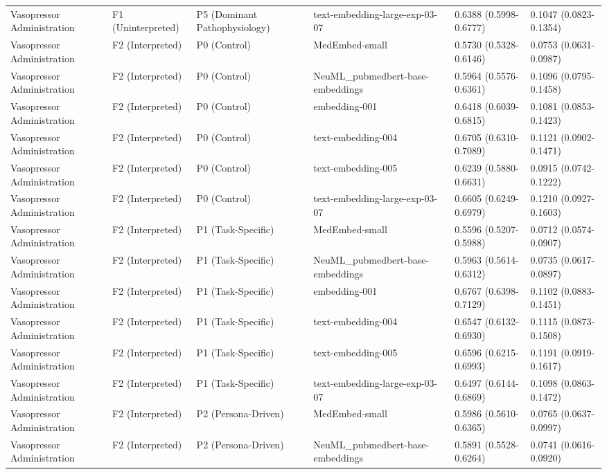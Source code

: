 \documentclass[border=0pt]{standalone}
\begin{document}
\begin{adjustbox}{width=\textwidth}
\begin{tabular}{llllll}
Vasopressor Administration & F1 (Uninterpreted) & P5 (Dominant Pathophysiology) & text-embedding-large-exp-03-07 & 0.6388 (0.5998-0.6777) & 0.1047 (0.0823-0.1354) \\
Vasopressor Administration & F2 (Interpreted) & P0 (Control) & MedEmbed-small & 0.5730 (0.5328-0.6146) & 0.0753 (0.0631-0.0987) \\
Vasopressor Administration & F2 (Interpreted) & P0 (Control) & NeuML\_pubmedbert-base-embeddings & 0.5964 (0.5576-0.6361) & 0.1096 (0.0795-0.1458) \\
Vasopressor Administration & F2 (Interpreted) & P0 (Control) & embedding-001 & 0.6418 (0.6039-0.6815) & 0.1081 (0.0853-0.1423) \\
Vasopressor Administration & F2 (Interpreted) & P0 (Control) & text-embedding-004 & 0.6705 (0.6310-0.7089) & 0.1121 (0.0902-0.1471) \\
Vasopressor Administration & F2 (Interpreted) & P0 (Control) & text-embedding-005 & 0.6239 (0.5880-0.6631) & 0.0915 (0.0742-0.1222) \\
Vasopressor Administration & F2 (Interpreted) & P0 (Control) & text-embedding-large-exp-03-07 & 0.6605 (0.6249-0.6979) & 0.1210 (0.0927-0.1603) \\
Vasopressor Administration & F2 (Interpreted) & P1 (Task-Specific) & MedEmbed-small & 0.5596 (0.5207-0.5988) & 0.0712 (0.0574-0.0907) \\
Vasopressor Administration & F2 (Interpreted) & P1 (Task-Specific) & NeuML\_pubmedbert-base-embeddings & 0.5963 (0.5614-0.6312) & 0.0735 (0.0617-0.0897) \\
Vasopressor Administration & F2 (Interpreted) & P1 (Task-Specific) & embedding-001 & 0.6767 (0.6398-0.7129) & 0.1102 (0.0883-0.1451) \\
Vasopressor Administration & F2 (Interpreted) & P1 (Task-Specific) & text-embedding-004 & 0.6547 (0.6132-0.6930) & 0.1115 (0.0873-0.1508) \\
Vasopressor Administration & F2 (Interpreted) & P1 (Task-Specific) & text-embedding-005 & 0.6596 (0.6215-0.6993) & 0.1191 (0.0919-0.1617) \\
Vasopressor Administration & F2 (Interpreted) & P1 (Task-Specific) & text-embedding-large-exp-03-07 & 0.6497 (0.6144-0.6869) & 0.1098 (0.0863-0.1472) \\
Vasopressor Administration & F2 (Interpreted) & P2 (Persona-Driven) & MedEmbed-small & 0.5986 (0.5610-0.6365) & 0.0765 (0.0637-0.0997) \\
Vasopressor Administration & F2 (Interpreted) & P2 (Persona-Driven) & NeuML\_pubmedbert-base-embeddings & 0.5891 (0.5528-0.6264) & 0.0741 (0.0616-0.0920) \\

\end{tabular}
\end{adjustbox}
\end{document}

